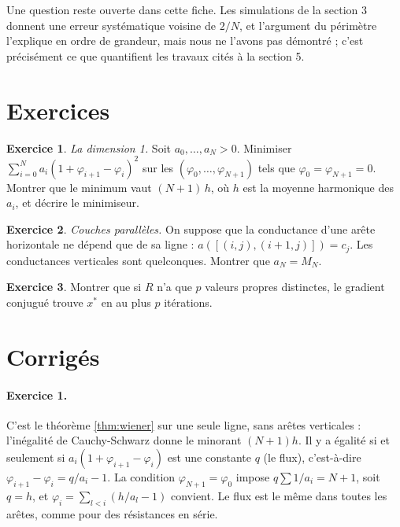 \documentclass[11pt,a4paper]{article}
\theoremstyle{plain}
\theoremstyle{definition}
\newtheorem{exercice}{Exercice}
\theoremstyle{remark}
\begin{document}
Une question reste ouverte dans cette fiche. Les simulations de la section 3 donnent une erreur systématique voisine de $2/N$, et l'argument du périmètre l'explique en ordre de grandeur, mais nous ne l'avons pas démontré ; c'est précisément ce que quantifient les travaux cités à la section 5.

\section{Exercices}

\begin{exercice}\label{exo:dim1}
\emph{La dimension 1.} Soit $a_0,\dots,a_N>0$. Minimiser $\sum_{i=0}^Na_i(1+\varphi_{i+1}-\varphi_i)^2$ sur les $(\varphi_0,\dots,\varphi_{N+1})$ tels que $\varphi_0=\varphi_{N+1}=0$. Montrer que le minimum vaut $(N+1)\,h$, où $h$ est la moyenne harmonique des $a_i$, et décrire le minimiseur.
\end{exercice}

\begin{exercice}\label{exo:couches}
\emph{Couches parallèles.} On suppose que la conductance d'une arête horizontale ne dépend que de sa ligne : $a([(i,j),(i+1,j)])=c_j$. Les conductances verticales sont quelconques. Montrer que $a_N=M_N$.
\end{exercice}

\begin{exercice}\label{exo:spectre}
Montrer que si $R$ n'a que $p$ valeurs propres distinctes, le gradient conjugué trouve $x^*$ en au plus $p$ itérations.
\end{exercice}


\section{Corrigés}

\paragraph{Exercice 1.} C'est le théorème \ref{thm:wiener} sur une seule ligne, sans arêtes verticales : l'inégalité de Cauchy-Schwarz donne le minorant $(N+1)h$. Il y a égalité si et seulement si $a_i(1+\varphi_{i+1}-\varphi_i)$ est une constante $q$ (le flux), c'est-à-dire $\varphi_{i+1}-\varphi_i=q/a_i-1$. La condition $\varphi_{N+1}=\varphi_0$ impose $q\sum1/a_i=N+1$, soit $q=h$, et $\varphi_i=\sum_{l<i}(h/a_l-1)$ convient. Le flux est le même dans toutes les arêtes, comme pour des résistances en série.
\end{document}
